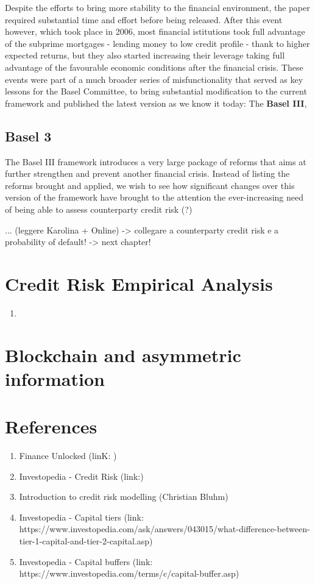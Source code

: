 \documentclass[a4paper,12pt]{article}
\begin{document}
    Despite the efforts to bring more stability to the financial environment, the paper required substantial time and effort before being released. After this event however, which took place in 2006,
    most financial istitutions took full advantage of the subprime mortgages - lending money to low credit profile - thank to higher expected returns, but they also started increasing their leverage
    taking full advantage of the favourable economic conditions after the financial crisis. These events were part of a much broader series of misfunctionality that served as key lessons for the Basel 
    Committee, to bring substantial modification to the current framework and published the latest version as we know it today: The \textbf{Basel III},

    \subsection[]{Basel 3}
    The Basel III framework introduces a very large package of reforms that aims at further strengthen and prevent another financial crisis. Instead of listing the reforms brought and applied, we wish
    to see how significant changes over this version of the framework have brought to the attention the ever-increasing need of being able to assess counterparty credit risk (?)

... (leggere Karolina + Online) -> collegare a counterparty credit risk e a probability of default! -> next chapter!

    \pagebreak
    \section{Credit Risk Empirical Analysis}

    \begin{enumerate}
        \item 
    \end{enumerate}
    
    \pagebreak
    \section{Blockchain and asymmetric information}

    \pagebreak
    \section{References}

    \begin{enumerate}
        \item Finance Unlocked (linK: )
        \item Investopedia - Credit Risk (link:)
        \item Introduction to credit risk modelling (Christian Bluhm)
        \item Investopedia - Capital tiers (link: https://www.investopedia.com/ask/answers/043015/what-difference-between-tier-1-capital-and-tier-2-capital.asp)
        \item Investopedia - Capital buffers (link: https://www.investopedia.com/terms/c/capital-buffer.asp)
    \end{enumerate}
\end{document}
